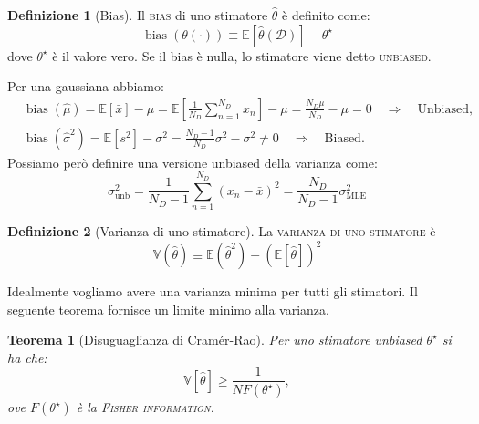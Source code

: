 \documentclass[10pt]{article}
\DeclareMathOperator{\bias}{bias}
\newcommand{\im}[1]{\textsc{#1}}
\newcommand{\MLE}{\ensuremath{\text{MLE}}}
\newtheorem{theorem}{Teorema}[section]
\theoremstyle{definition}
\newtheorem{definition}{Definizione}[section]
\begin{document}
    \begin{definition}[Bias]
        Il \im{bias} di uno stimatore \( \hat{\theta} \) è definito come:
        \begin{equation}
            \bias \left( \theta(\cdot) \right) \equiv \mathbb{E} \left[ \hat{\theta} \left( \mathcal{D} \right) \right] - \theta^\star
        \end{equation}
        dove \( \theta^\star \) è il valore vero. Se il bias è nulla, lo stimatore viene detto
        \im{unbiased}.
    \end{definition}

    Per una gaussiana abbiamo:
    \begin{align}
        & \bias \left( \hat{\mu} \right) = \mathbb{E} \left[\bar{x}\right] - \mu = \mathbb{E} \left[ \frac{1}{N_D}\sum_{n=1}^{N_D} x_n \right] - \mu = \frac{N_D \mu}{N_D} - \mu = 0  \quad \Longrightarrow \quad \text{Unbiased},  \\
        & \bias \left( \hat{\sigma}^2 \right) = \mathbb{E} \left[ s^2 \right] - \sigma^2 = \frac{N_D - 1}{N_D}\sigma^2 - \sigma^2 \neq 0  \quad \Longrightarrow \quad \text{Biased}.
    \end{align}
    Possiamo però definire una versione unbiased della varianza come:
    \begin{equation}
        \sigma^2_{\text{unb}} = \frac{1}{N_D - 1}\sum_{n=1}^{N_D} {\left( x_n - \bar{x} \right)}^2 = \frac{N_D}{N_D - 1}\sigma^2_{\MLE}
    \end{equation}

    \begin{definition}[Varianza di uno stimatore]
        La \im{varianza di uno stimatore} è
        \begin{equation}
            \mathbb{V} ( \hat{\theta} ) \equiv \mathbb{E} ( \hat{\theta}^2 ) - {( \mathbb{E} [ \hat{\theta} ] )}^2
        \end{equation}
    \end{definition}

    Idealmente vogliamo avere una varianza minima per tutti gli stimatori. Il seguente
    teorema fornisce un limite minimo alla varianza.

    \begin{theorem}[Disuguaglianza di Cramér-Rao]
        Per uno stimatore \underline{unbiased} \( \theta^\star \) si ha che:
        \begin{equation}
            \mathbb{V} \left[ \hat{\theta} \right] \geq \frac{1}{NF(\theta^\star)},
        \end{equation}
        ove \( F(\theta^\star) \) è la \im{Fisher information}.
    \end{theorem}
\end{document}
